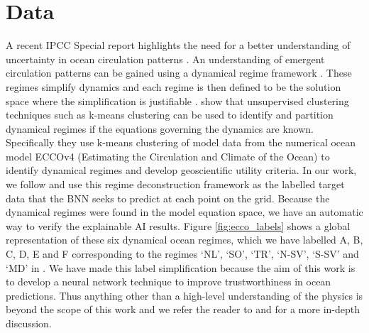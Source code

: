 \documentclass[a4paper]{article}
\begin{document}
\section{Data}\label{sec:data}
A recent IPCC Special report highlights the need for a better understanding of uncertainty in ocean circulation patterns \citep{hoegh2018impacts}. An understanding of emergent circulation patterns can be gained using a dynamical regime framework \citep{sonnewald2019unsupervised}. These regimes simplify dynamics and each regime is then defined to be the solution space where the simplification is justifiable \citep{kaiser2021objective}. \cite{sonnewald2019unsupervised} show that unsupervised clustering techniques such as k-means clustering can be used to identify and partition dynamical regimes if the equations governing the dynamics are known. Specifically they use k-means clustering of model data from the numerical ocean model ECCOv4 (Estimating the Circulation and Climate of the Ocean) to identify dynamical regimes and develop geoscientific utility criteria. In our work, we follow \cite{THOR} and use this regime deconstruction framework as the labelled target data that the BNN seeks to predict at each point on the grid. Because the dynamical regimes were found in the model equation space, we have an automatic way to verify the explainable AI results. Figure \ref{fig:ecco_labels} shows a global representation of these six dynamical ocean regimes, which we have labelled A, B, C, D, E and F corresponding to the regimes `NL', `SO', `TR', `N-SV', `S-SV' and `MD' in \cite{THOR}. We have made this label simplification because the aim of this work is to develop a neural network technique to improve trustworthiness in ocean predictions. Thus anything other than a high-level understanding of the physics is beyond the scope of this work and we refer the reader to \cite{sonnewald2019unsupervised} and \cite{THOR} for a more in-depth discussion.
\end{document}
